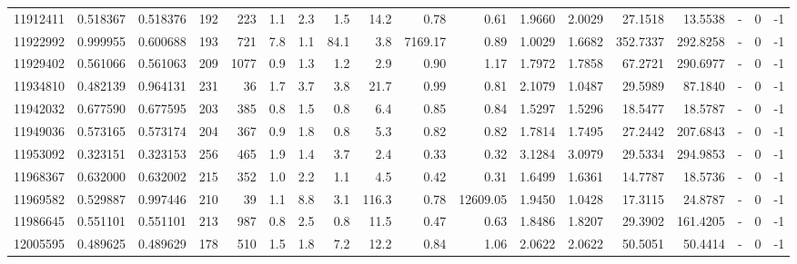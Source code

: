 \begin{tabular}{rrrrrrrrrrrrrrrlrr}
  11912411 & 0.518367 &   0.518376 &  192 &  223 &      1.1 &      2.3 &     1.5 &     14.2 &       0.78 &        0.61 &  1.9660 &  2.0029 &   27.1518 &   13.5538 &             - &        0 &         -1 \\
  11922992 & 0.999955 &   0.600688 &  193 &  721 &      7.8 &      1.1 &    84.1 &      3.8 &    7169.17 &        0.89 &  1.0029 &  1.6682 &  352.7337 &  292.8258 &             - &        0 &         -1 \\
  11929402 & 0.561066 &   0.561063 &  209 & 1077 &      0.9 &      1.3 &     1.2 &      2.9 &       0.90 &        1.17 &  1.7972 &  1.7858 &   67.2721 &  290.6977 &             - &        0 &         -1 \\
  11934810 & 0.482139 &   0.964131 &  231 &   36 &      1.7 &      3.7 &     3.8 &     21.7 &       0.99 &        0.81 &  2.1079 &  1.0487 &   29.5989 &   87.1840 &             - &        0 &         -1 \\
  11942032 & 0.677590 &   0.677595 &  203 &  385 &      0.8 &      1.5 &     0.8 &      6.4 &       0.85 &        0.84 &  1.5297 &  1.5296 &   18.5477 &   18.5787 &             - &        0 &         -1 \\
  11949036 & 0.573165 &   0.573174 &  204 &  367 &      0.9 &      1.8 &     0.8 &      5.3 &       0.82 &        0.82 &  1.7814 &  1.7495 &   27.2442 &  207.6843 &             - &        0 &         -1 \\
  11953092 & 0.323151 &   0.323153 &  256 &  465 &      1.9 &      1.4 &     3.7 &      2.4 &       0.33 &        0.32 &  3.1284 &  3.0979 &   29.5334 &  294.9853 &             - &        0 &         -1 \\
  11968367 & 0.632000 &   0.632002 &  215 &  352 &      1.0 &      2.2 &     1.1 &      4.5 &       0.42 &        0.31 &  1.6499 &  1.6361 &   14.7787 &   18.5736 &             - &        0 &         -1 \\
  11969582 & 0.529887 &   0.997446 &  210 &   39 &      1.1 &      8.8 &     3.1 &    116.3 &       0.78 &    12609.05 &  1.9450 &  1.0428 &   17.3115 &   24.8787 &             - &        0 &         -1 \\
  11986645 & 0.551101 &   0.551101 &  213 &  987 &      0.8 &      2.5 &     0.8 &     11.5 &       0.47 &        0.63 &  1.8486 &  1.8207 &   29.3902 &  161.4205 &             - &        0 &         -1 \\
  12005595 & 0.489625 &   0.489629 &  178 &  510 &      1.5 &      1.8 &     7.2 &     12.2 &       0.84 &        1.06 &  2.0622 &  2.0622 &   50.5051 &   50.4414 &             - &        0 &         -1 \\

\end{tabular}
